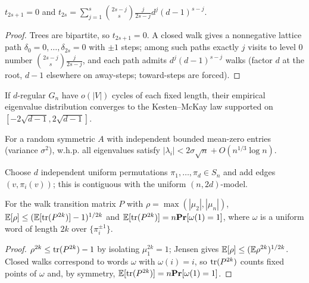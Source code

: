 \begin{lemma}
  \label{lem:tree-return-walks}
  $t_{2s+1}=0$ and
  $t_{2s}=\sum_{j=1}^s\binom{2s-j}s\frac j{2s-j}d^j(d-1)^{s-j}$.
\end{lemma}
\begin{proof}
  Trees are bipartite, so $t_{2s+1}=0$. A closed walk gives a nonnegative
  lattice path $\delta_0=0,\dots,\delta_{2s}=0$ with $\pm1$ steps; among such
  paths exactly $j$ visits to level $0$ number $\binom{2s-j}s\frac j{2s-j}$, and
  each path admits $d^j(d-1)^{s-j}$ walks (factor $d$ at the root, $d-1$
  elsewhere on away-steps; toward-steps are forced).
\end{proof}

\begin{theorem}
  \label{thm:mckay}
  \notready
  If $d$-regular $G_n$ have $o(|V|)$ cycles of each fixed length, their empirical
  eigenvalue distribution converges to the Kesten--McKay law supported on
  $[-2\sqrt{d-1},2\sqrt{d-1}]$.
\end{theorem}

\begin{theorem}
  \label{thm:furedi-komlos-vu}
  \notready
  For a random symmetric $A$ with independent bounded mean-zero entries (variance
  $\sigma^2$), w.h.p. all eigenvalues satisfy $|\lambda_i|<2\sigma\sqrt n+O(n^{1/3}\log n)$.
\end{theorem}

\begin{definition}
  \label{def:permutation-model}
  Choose $d$ independent uniform permutations $\pi_1,\dots,\pi_d\in S_n$ and add
  edges $(v,\pi_i(v))$; this is contiguous with the uniform $(n,2d)$-model.
\end{definition}

\begin{lemma}
  \label{lem:trace-fixed-points}
  For the walk transition matrix $P$ with $\rho=\max(|\mu_2|,|\mu_n|)$,
  $\mathbb{E}[\rho]\le(\mathbb{E}[\operatorname{tr}(P^{2k})]-1)^{1/2k}$ and
  $\mathbb{E}[\operatorname{tr}(P^{2k})]=n\mathbf{Pr}[\omega(1)=1]$, where $\omega$ is a uniform word of length
  $2k$ over $\{\pi_i^{\pm1}\}$.
\end{lemma}
\begin{proof}
  $\rho^{2k}\le\operatorname{tr}(P^{2k})-1$ by isolating $\mu_1^{2k}=1$; Jensen gives
  $\mathbb{E}[\rho]\le(\mathbb{E}\rho^{2k})^{1/2k}$. Closed walks correspond to words $\omega$
  with $\omega(i)=i$, so $\operatorname{tr}(P^{2k})$ counts fixed points of $\omega$ and, by
  symmetry, $\mathbb{E}[\operatorname{tr}(P^{2k})]=n\mathbf{Pr}[\omega(1)=1]$.
\end{proof}

